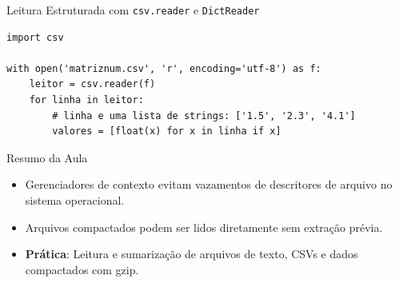 \documentclass[aspectratio=169, 10pt]{beamer}
\begin{document}
\begin{frame}[fragile]{Leitura Estruturada com \texttt{csv.reader} e \texttt{DictReader}}
  \begin{lstlisting}
import csv

with open('matriznum.csv', 'r', encoding='utf-8') as f:
    leitor = csv.reader(f)
    for linha in leitor:
        # linha e uma lista de strings: ['1.5', '2.3', '4.1']
        valores = [float(x) for x in linha if x]
  \end{lstlisting}
\end{frame}

\begin{frame}{Resumo da Aula}
  \begin{itemize}
    \item Gerenciadores de contexto evitam vazamentos de descritores de arquivo no sistema operacional.
    \item Arquivos compactados podem ser lidos diretamente sem extração prévia.
    \item \textbf{Prática}: Leitura e sumarização de arquivos de texto, CSVs e dados compactados com gzip.
  \end{itemize}
\end{frame}
\end{document}
